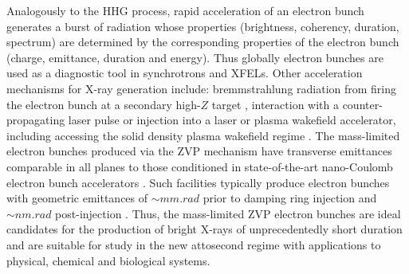 Analogously to the \ac{HHG} process, rapid acceleration of an electron bunch generates a burst of radiation whose properties (brightness, coherency, duration, spectrum) are determined by the corresponding properties of the electron bunch (charge, emittance, duration and energy). Thus globally electron bunches are used as a diagnostic tool in synchrotrons and XFELs. Other acceleration mechanisms for X-ray generation include: bremmstrahlung radiation from firing the electron bunch at a secondary high-$Z$ target \cite{cordeFemtosecondRaysLaserplasma2013}, interaction with a counter-propagating laser pulse \cite{khrennikovTunableAllOpticalQuasimonochromatic2015,kulaginNonlinearReflectionHighamplitude2016} or injection into a laser or plasma wakefield accelerator, including accessing the solid density plasma wakefield regime \cite{linIsolatedAttosecondElectron2020}. The mass-limited electron bunches produced via the ZVP mechanism have transverse emittances comparable in all planes to those conditioned in state-of-the-art nano-Coulomb electron bunch accelerators \cite{martinDiamondLightSource2020,pingProgressHEPSProject2020}. Such facilities typically produce electron bunches with geometric emittances of $\sim \unit{mm.rad}$ prior to damping ring injection \cite{christouPreInjectorLinacDiamond2004} and $\sim \unit{nm.rad}$ post-injection \cite{martinDiamondLightSource2020}. Thus, the mass-limited ZVP electron bunches are ideal candidates for the production of bright X-rays of unprecedentedly short duration and are suitable for study in the new attosecond regime with applications to physical, chemical and biological systems.

